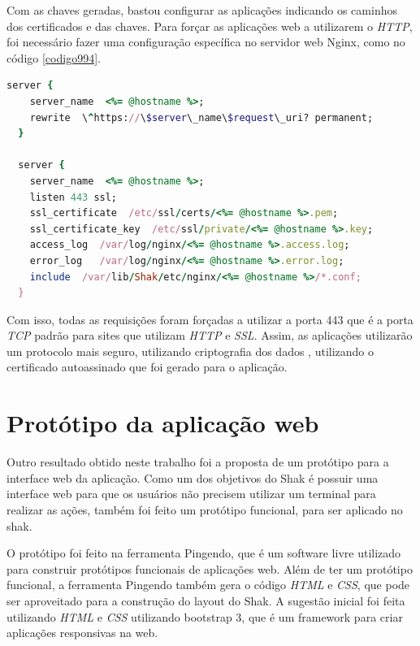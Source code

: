 Com as chaves geradas, bastou configurar as aplicações indicando os caminhos dos certificados
e das chaves. Para forçar as aplicações web a utilizarem o \textit{HTTP}, foi necessário fazer
uma configuração específica no servidor web Nginx, como no código \ref{codigo994}.

\begin{lstlisting}[language=Ruby,label=dice_index,caption={Exemplo de arquivo de configuração do Nginx para aplicações web no shak}, label=codigo994]
  server {
    server_name  <%= @hostname %>;
    rewrite  \^https://\$server\_name\$request\_uri? permanent;
  }

  server {
    server_name  <%= @hostname %>;
    listen 443 ssl;
    ssl_certificate  /etc/ssl/certs/<%= @hostname %>.pem;
    ssl_certificate_key  /etc/ssl/private/<%= @hostname %>.key;
    access_log  /var/log/nginx/<%= @hostname %>.access.log;
    error_log   /var/log/nginx/<%= @hostname %>.error.log;
    include  /var/lib/Shak/etc/nginx/<%= @hostname %>/*.conf;
  }
\end{lstlisting}

Com isso, todas as requisições foram forçadas a utilizar a porta 443 que é a porta
\textit{TCP} padrão para sites que utilizam \textit{HTTP} e \textit{SSL}. Assim, 
as aplicações utilizarão um protocolo mais seguro, utilizando criptografia dos dados
, utilizando o certificado autoassinado que foi gerado para o aplicação.

\section{Protótipo da aplicação web}
\label{sub:prototipo}

Outro resultado obtido neste trabalho foi a proposta de um protótipo para a interface
web da aplicação. Como um dos objetivos do Shak é possuir uma interface web para que
os usuários não precisem utilizar um terminal para realizar as ações, também foi
feito um protótipo funcional, para ser aplicado no shak. 

O protótipo foi feito
na ferramenta Pingendo, que é um software livre utilizado para construir
protótipos funcionais de aplicações web. Além de ter um protótipo funcional, a 
ferramenta Pingendo
também gera o código \textit{HTML} e \textit{CSS}, que pode ser aproveitado para 
a construção do layout do Shak. A sugestão inicial foi feita utilizando \textit{HTML} e \textit{CSS} utilizando bootstrap 3, que é um framework para criar aplicações responsivas 
na web. 

